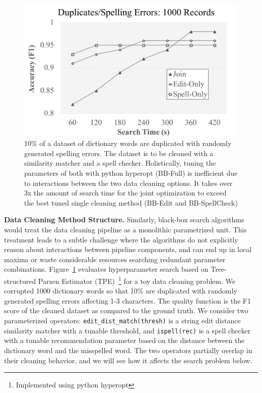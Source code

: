 \begin{figure}[t]
\centering
 \includegraphics[width=0.9\columnwidth]{figures/teaser-experiment.png}
 \caption{\small 10\% of a dataset of dictionary words are duplicated with randomly generated spelling errors. The dataset is to be cleaned with a similarity matcher and a spell checker. Holistically, tuning the parameters of both with \textsf{python hyperopt} (BB-Full) is inefficient due to interactions between the two data cleaning options. It takes over 3x the amount of search time for the joint optimization to exceed the best tuned single cleaning method (BB-Edit and BB-SpellCheck) \label{fig:teaser}}
\end{figure}


\vspace{0.5em}
\noindent \textbf{Data Cleaning Method Structure. } Similarly, black-box search algorithms would treat the data cleaning pipeline as a monolithic parametrized unit.
This treatment leads to a subtle challenge where the algorithms do not explicitly reason about interactions between pipeline components, and can end up in local maxima or waste considerable resources searching redundant parameter combinations.
Figure~\ref{fig:teaser} evaluates hyperparameter search based on Tree-structured Parzen Estimator (TPE)~\cite{shahriari2016taking}\footnote{Implemented using \textsf{python hyperopt}} for a toy data cleaning problem.  We corrupted 1000 dictionary words so that 10\% are duplicated with randomly generated spelling errors affecting 1-3 characters. The quality function is the F1 score of the cleaned dataset as compared to the ground truth.  We consider two parameterized operators: \texttt{edit\_dist\_match(thresh)} is a string edit distance similarity matcher with a tunable threshold, and \texttt{ispell(rec)} is a spell checker with a tunable recommendation parameter based on the distance between the dictionary word and the misspelled word.  The two operators partially overlap in their cleaning behavior, and we will see how it affects the search problem below.   

